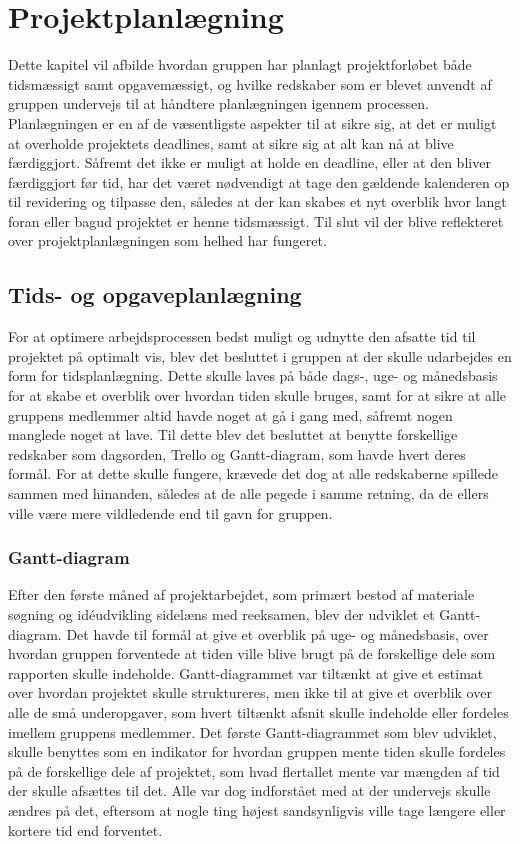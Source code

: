 \chapter{Projektplanlægning}\label{Projektplanlaegning}
Dette kapitel vil afbilde hvordan gruppen har planlagt projektforløbet både tidsmæssigt samt opgavemæssigt, og hvilke redskaber som er blevet anvendt af gruppen undervejs til at håndtere planlægningen igennem processen. Planlægningen er en af de væsentligste aspekter til at sikre sig, at det er muligt at overholde projektets deadlines, samt at sikre sig at alt kan nå at blive færdiggjort. Såfremt det ikke er muligt at holde en deadline, eller at den bliver færdiggjort før tid, har det været nødvendigt at tage den gældende kalenderen op til revidering og tilpasse den, således at der kan skabes et nyt overblik hvor langt foran eller bagud projektet er henne tidsmæssigt. Til slut vil der blive reflekteret over projektplanlægningen som helhed har fungeret.

\section{Tids- og opgaveplanlægning}\label{Tidsplanlaegning}
For at optimere arbejdsprocessen bedst muligt og udnytte den afsatte tid til projektet på optimalt vis, blev det besluttet i gruppen at der skulle udarbejdes en form for tidsplanlægning. Dette skulle laves på både dags-, uge- og månedsbasis for at skabe et overblik over hvordan tiden skulle bruges, samt for at sikre at alle gruppens medlemmer altid havde noget at gå i gang med, såfremt nogen manglede noget at lave. Til dette blev det besluttet at benytte forskellige redskaber som dagsorden, Trello og Gantt-diagram, som havde hvert deres formål. For at dette skulle fungere, krævede det dog at alle redskaberne spillede sammen med hinanden, således at de alle pegede i samme retning, da de ellers ville være mere vildledende end til gavn for gruppen.

\subsection{Gantt-diagram}\label{Gantt-diagram}
Efter den første måned af projektarbejdet, som primært bestod af materiale søgning og idéudvikling sidelæns med reeksamen, blev der udviklet et Gantt-diagram. Det havde til formål at give et overblik på uge- og månedsbasis, over hvordan gruppen forventede at tiden ville blive brugt på de forskellige dele som rapporten skulle indeholde. Gantt-diagrammet var tiltænkt at give et estimat over hvordan projektet skulle struktureres, men ikke til at give et overblik over alle de små underopgaver, som hvert tiltænkt afsnit skulle indeholde eller fordeles imellem gruppens medlemmer. Det første Gantt-diagrammet som blev udviklet, skulle benyttes som en indikator for hvordan gruppen mente tiden skulle fordeles på de forskellige dele af projektet, som hvad flertallet mente var mængden af tid der skulle afsættes til det. Alle var dog indforstået med at der undervejs skulle ændres på det, eftersom at nogle ting højest sandsynligvis ville tage længere eller kortere tid end forventet.

